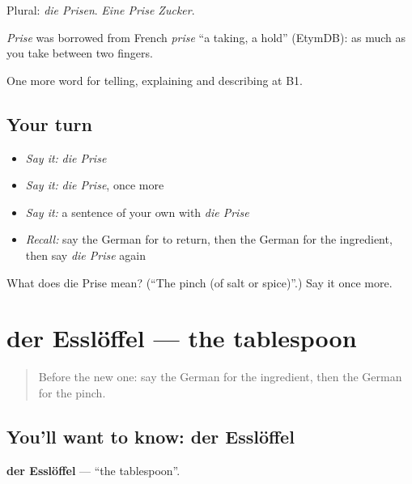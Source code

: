 Plural: \emph{die Prisen}. \emph{Eine Prise Zucker}.

\begin{cousinweb}
\emph{Prise} was borrowed from French \emph{prise} \textquotedblleft{}a taking, a hold\textquotedblright{} (EtymDB): as much as you take between two fingers.
\end{cousinweb}

\begin{grammarlens}[title={What you've built}]
One more word for telling, explaining and describing at B1.
\end{grammarlens}

\subsection*{Your turn}
\begin{itemize}
\raggedright
  \item \emph{Say it:} \emph{die Prise}
  \item \emph{Say it:} \emph{die Prise}, once more
  \item \emph{Say it:} a sentence of your own with \emph{die Prise}
  \item \emph{Recall:} say the German for to return, then the German for the ingredient, then say \emph{die Prise} again
\end{itemize}

\begin{tcolorbox}[breakable,colback=teal!4,colframe=teal!35!black,title={Before you move on}]
What does die Prise mean? (\textquotedblleft{}The pinch (of salt or spice)\textquotedblright{}.) Say it once more.
\end{tcolorbox}
\section[der Esslöffel]{der Esslöffel — the tablespoon}

\label{lesson:GE-C322-essloeffel}



\begin{quote}
Before the new one: say the German for the ingredient, then the German for the pinch.
\end{quote}

\subsection*{You'll want to know: der Esslöffel}
\textbf{der Esslöffel} — \textquotedblleft{}the tablespoon\textquotedblright{}.

